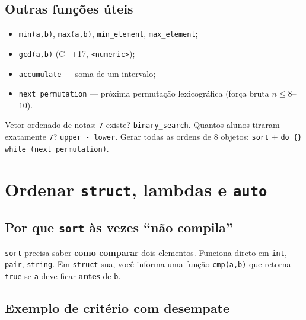 \subsection{Outras funções úteis}

\begin{itemize}[nosep]
  \item \texttt{min(a,b)}, \texttt{max(a,b)}, \texttt{min\_element}, \texttt{max\_element};
  \item \texttt{gcd(a,b)} (C++17, \texttt{<numeric>});
  \item \texttt{accumulate} --- soma de um intervalo;
  \item \texttt{next\_permutation} --- próxima permutação lexicográfica (força bruta $n \le 8$--$10$).
\end{itemize}

\begin{exemplodiabox}
Vetor ordenado de notas: \texttt{7} existe? \texttt{binary\_search}. Quantos alunos tiraram exatamente \texttt{7}? \texttt{upper - lower}. Gerar todas as ordens de 8 objetos: \texttt{sort} + \texttt{do \{\} while (next\_permutation)}.
\end{exemplodiabox}



\section{Ordenar \texttt{struct}, lambdas e \texttt{auto}}

\subsection{Por que \texttt{sort} às vezes ``não compila''}

\texttt{sort} precisa saber \textbf{como comparar} dois elementos. Funciona direto em \texttt{int}, \texttt{pair}, \texttt{string}. Em \texttt{struct} sua, você informa uma função \texttt{cmp(a,b)} que retorna \texttt{true} se \texttt{a} deve ficar \textbf{antes} de \texttt{b}.

\subsection{Exemplo de critério com desempate}

